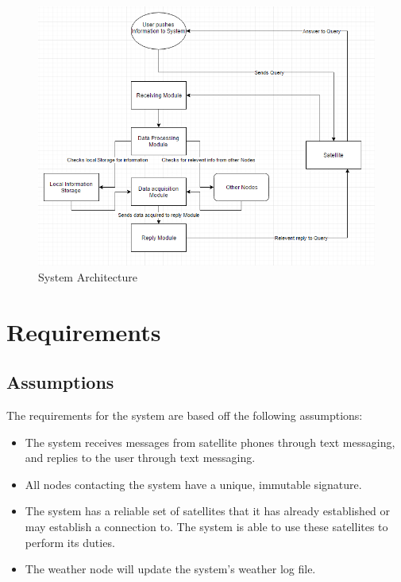 \documentclass{article}
\begin{document}
\begin{figure}[H]
    \includegraphics[width=\linewidth]{model.png}
    \caption {System Architecture}
    \label {fig:system}
\end{figure}

\section {Requirements}
\subsection{Assumptions}
The requirements for the system are based off the following assumptions:
\begin{itemize}
    \item The system receives messages from satellite phones through text messaging, and replies to the user through text messaging.
    \item All nodes contacting the system have a unique, immutable signature.
    \item The system has a reliable set of satellites that it has already established or may establish a connection to. The system is able to use these satellites to perform its duties.
    \item The weather node will update the system's weather log file.
\end{itemize}
\end{document}
